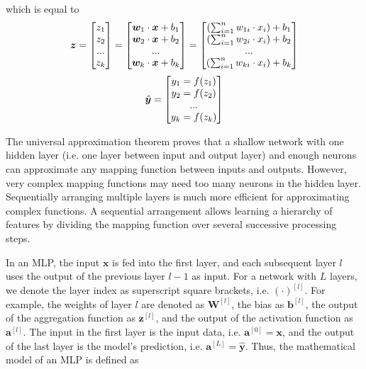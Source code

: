 %
which is equal to
%
\begin{equation}\eqlbl{nn4}%
		\boldsymbol{z} = \begin{bmatrix}
			z_1\\
			z_2\\
			...\\
			z_k\\
		\end{bmatrix} = \begin{bmatrix}
			\boldsymbol{w}_1 \cdot \boldsymbol{x} + b_1\\
			\boldsymbol{w}_2 \cdot \boldsymbol{x} + b_2\\
			...\\
			\boldsymbol{w}_k \cdot \boldsymbol{x} + b_k\\
		\end{bmatrix} = \begin{bmatrix}
			\left( \sum_{i=1}^{n}w_{1i} \cdot x_i \right) + b_1\\
			\left( \sum_{i=1}^{n}w_{2i} \cdot x_i \right) + b_2\\
			...\\
			\left( \sum_{i=1}^{n}w_{ki} \cdot x_i \right) + b_k\\
		\end{bmatrix}
\end{equation}
\begin{equation}\eqlbl{nn5}%
		\hat{\boldsymbol{y}} = \begin{bmatrix}
			y_1 = f(z_1)\\
			y_2 = f(z_2)\\
			...\\
			y_k = f(z_k)\\
		\end{bmatrix}
\end{equation}
%

The universal approximation theorem proves that a shallow network with one hidden layer (i.e. one layer between input and output layer) and enough neurons can approximate any mapping function between inputs and outputs.
However, very complex mapping functions may need too many neurons in the hidden layer.
Sequentially arranging multiple layers is much more efficient for approximating complex functions.
A sequential arrangement allows learning a hierarchy of features by dividing the mapping function over several successive processing steps.

In an MLP, the input \(\boldsymbol{x}\) is fed into the first layer, and each subsequent layer \(l\) uses the output of the previous layer \(l-1\) as input.
For a network with \(L\) layers, we denote the layer index as superscript square brackets, i.e. $(\cdot)^{[l]}$.
For example, the weights of layer $l$ are denoted as $\boldsymbol{W}^{[l]}$, the bias as \(\boldsymbol{b}^{[l]}\), the output of the aggregation function as \(\boldsymbol{z}^{[l]}\), and the output of the activation function as \(\boldsymbol{a}^{[l]}\).
The input in the first layer is the input data, i.e. $\boldsymbol{a}^{[0]} = \boldsymbol{x}$, and the output of the last layer is the model's prediction, i.e. $\boldsymbol{a}^{[L]} = \hat{\boldsymbol{y}}$. Thus, the mathematical model of an MLP is defined as

